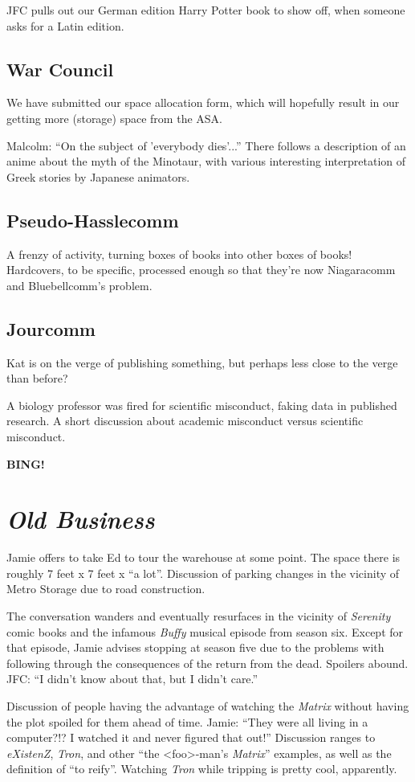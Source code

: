 \documentclass[10pt]{article}
\newcommand{\bing}{{\bf BING!} }
\newcommand{\goto}[1]{\bing \vskip 12pt \section*{{\em{#1}}}}
\begin{document}
JFC pulls out our German edition Harry Potter book to show off, when
someone asks for a Latin edition.

\subsection*{War Council}

We have submitted our space allocation form, which will hopefully result
in our getting more (storage) space from the ASA.

Malcolm: ``On the subject of 'everybody dies'...''  There follows a
description of an anime about the myth of the Minotaur, with various
interesting interpretation of Greek stories by Japanese animators.

\subsection*{Pseudo-Hasslecomm}

A frenzy of activity, turning boxes of books into other boxes of books!
Hardcovers, to be specific, processed enough so that they're now Niagaracomm
and Bluebellcomm's problem.

\subsection*{Jourcomm}

Kat is on the verge of publishing something, but perhaps less close to
the verge than before?

A biology professor was fired for scientific misconduct, faking data in
published research.  A short discussion about academic misconduct versus
scientific misconduct.

\goto{Old Business}

Jamie offers to take Ed to tour the warehouse at some point.  The space
there is roughly 7 feet x 7 feet x ``a lot''.  Discussion of parking
changes in the vicinity of Metro Storage due to road construction.

The conversation wanders and eventually resurfaces in the vicinity of
{\em Serenity} comic books and the infamous {\em Buffy} musical episode
from season six.  Except for that episode, Jamie advises stopping at
season five due to the problems with following through the consequences
of the return from the dead.  Spoilers abound.  JFC: ``I didn't know
about that, but I didn't care.''

Discussion of people having the advantage of watching the {\em Matrix}
without having the plot spoiled for them ahead of time.  Jamie: ``They
were all living in a computer?!?  I watched it and never figured that out!''
Discussion ranges to {\em eXistenZ}, {\em Tron}, and other 
``the <foo>-man's {\em Matrix}'' examples, as well as the definition of
``to reify''.  Watching {\em Tron} while tripping is pretty cool,
apparently.
\end{document}
